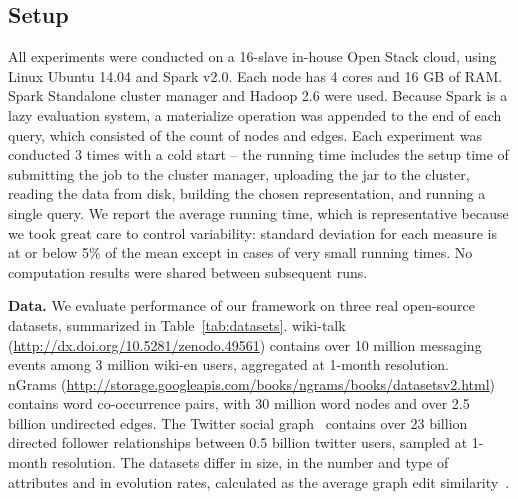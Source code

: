 \subsection{Setup}
\label{sec:exp:setup}

All experiments were conducted on a 16-slave in-house Open Stack
cloud, using Linux Ubuntu 14.04 and Spark v2.0.  Each node has 4 cores
and 16 GB of RAM.  Spark Standalone cluster manager and Hadoop 2.6
were used.
%
Because Spark is a lazy evaluation system, a materialize operation was
appended to the end of each query, which consisted of the count of
nodes and edges.  Each experiment was conducted 3 times with a cold
start -- the running time includes the setup time of submitting the
job to the cluster manager, uploading the jar to the cluster, reading
the data from disk, building the chosen representation, and running
a single query.  We report the average running time, which is
representative because we took great care to control variability:
standard deviation for each measure is at or below 5\% of the mean
except in cases of very small running times.  No computation results
were shared between subsequent runs.


{\bf Data.}  We evaluate performance of our framework on three real
open-source datasets, summarized in Table~\ref{tab:datasets}.
wiki-talk (\url{http://dx.doi.org/10.5281/zenodo.49561}) contains over
10 million messaging events among 3 million wiki-en users, aggregated at 1-month resolution.\\nGrams
(\url{http://storage.googleapis.com/books/ngrams/books/datasetsv2.html})
contains word co-occurrence pairs, with
30 million word nodes and over 2.5 billion undirected edges.  The
Twitter social graph~\cite{Gabielkov:2014:SSN:2591971.2591985}
contains over 23 billion directed follower relationships between 0.5
billion twitter users, sampled at 1-month
resolution. The datasets differ in size, in the number
and type of attributes and in evolution rates, calculated as the
average graph edit similarity~\cite{Ren2011}. 

